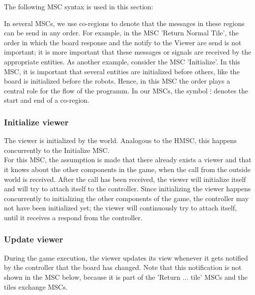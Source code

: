 	The following MSC syntax is used in this section:

	

	In several MSCs, we use co-regions to denote that the messages in these regions can be send in any order. For example, in the MSC 'Return Normal Tile', the order in which the board response and the notify to the Viewer are send is not important; it is more important that these messages or signals are received by the appropriate entities. As another example, consider the MSC 'Initialize'. In this MSC, it is important that several entities are initialized before others, like the board is initialized before the robots. Hence, in this MSC the order plays a central role for the flow of the programm. In our MSCs, the symbol $\vdots$ denotes the start and end of a co-region.

	\subsubsection{Initialize viewer}
	\begin{minipage}{\linewidth}
		The viewer is initialized by the world. Analogous to the HMSC, this happens concurrently to the Initialize MSC. \\
For this MSC, the assumption is made that there already exists a viewer and that it knows about the other components in the game, when the call from the outside world is received. After the call has been received, the viewer will initialize itself and will try to attach itself to the controller. Since initializing the viewer happens concurrently to initializing the other components of the game, the controller may not have been initialized yet; the viewer will continuously try to attach itself, until it receives a respond from the controller.
	
		
	\end{minipage}

    	\subsubsection{Update viewer}
	\begin{minipage}{\linewidth}
		During the game execution, the viewer updates its view whenever it gets notified by the controller that the board has changed. Note that this notification is not shown in the MSC below, because it is part of the 'Return ... tile' MSCs and the tiles exchange MSCs.

		
	\end{minipage}

